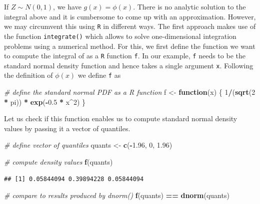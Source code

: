 \documentclass[]{book}
\newenvironment{Shaded}{\begin{snugshade}}{\end{snugshade}}
\newcommand{\KeywordTok}[1]{\textcolor[rgb]{0.13,0.29,0.53}{\textbf{#1}}}
\newcommand{\DecValTok}[1]{\textcolor[rgb]{0.00,0.00,0.81}{#1}}
\newcommand{\FloatTok}[1]{\textcolor[rgb]{0.00,0.00,0.81}{#1}}
\newcommand{\StringTok}[1]{\textcolor[rgb]{0.31,0.60,0.02}{#1}}
\newcommand{\CommentTok}[1]{\textcolor[rgb]{0.56,0.35,0.01}{\textit{#1}}}
\newcommand{\ControlFlowTok}[1]{\textcolor[rgb]{0.13,0.29,0.53}{\textbf{#1}}}
\newcommand{\OperatorTok}[1]{\textcolor[rgb]{0.81,0.36,0.00}{\textbf{#1}}}
\newcommand{\NormalTok}[1]{#1}
\theoremstyle{definition}
\theoremstyle{definition}
\theoremstyle{definition}
\theoremstyle{remark}
\begin{document}
If \(Z \sim N(0,1)\), we have \(g(x)=\phi(x)\). There is no analytic
solution to the integral above and it is cumbersome to come up with an
approximation. However, we may circumvent this using \texttt{R} in
different ways. The first approach makes use of the function
\texttt{integrate()} which allows to solve one-dimensional integration
problems using a numerical method. For this, we first define the
function we want to compute the integral of as a \texttt{R} function
\texttt{f}. In our example, \texttt{f} needs to be the standard normal
density function and hence takes a single argument \texttt{x}. Following
the definition of \(\phi(x)\) we define \texttt{f} as

\begin{Shaded}
\begin{Highlighting}[]
\CommentTok{# define the standard normal PDF as a R function}
\NormalTok{f <-}\StringTok{ }\ControlFlowTok{function}\NormalTok{(x) \{}
  \DecValTok{1}\OperatorTok{/}\NormalTok{(}\KeywordTok{sqrt}\NormalTok{(}\DecValTok{2} \OperatorTok{*}\StringTok{ }\NormalTok{pi)) }\OperatorTok{*}\StringTok{ }\KeywordTok{exp}\NormalTok{(}\OperatorTok{-}\FloatTok{0.5} \OperatorTok{*}\StringTok{ }\NormalTok{x}\OperatorTok{^}\DecValTok{2}\NormalTok{)}
\NormalTok{\}}
\end{Highlighting}
\end{Shaded}

Let us check if this function enables us to compute standard normal
density values by passing it a vector of quantiles.

\begin{Shaded}
\begin{Highlighting}[]
\CommentTok{# define vector of quantiles}
\NormalTok{quants <-}\StringTok{ }\KeywordTok{c}\NormalTok{(}\OperatorTok{-}\FloatTok{1.96}\NormalTok{, }\DecValTok{0}\NormalTok{, }\FloatTok{1.96}\NormalTok{)}

\CommentTok{# compute density values}
\KeywordTok{f}\NormalTok{(quants)}
\end{Highlighting}
\end{Shaded}

\begin{verbatim}
## [1] 0.05844094 0.39894228 0.05844094
\end{verbatim}

\begin{Shaded}
\begin{Highlighting}[]
\CommentTok{# compare to results produced by dnorm()}
\KeywordTok{f}\NormalTok{(quants) }\OperatorTok{==}\StringTok{ }\KeywordTok{dnorm}\NormalTok{(quants)}
\end{Highlighting}
\end{Shaded}
\end{document}
